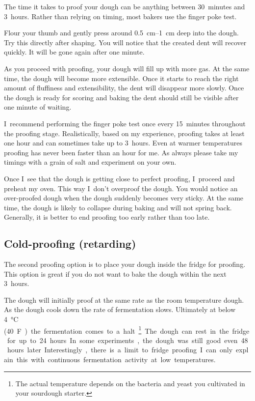 The time it takes to proof your dough can be anything between 30~minutes and
3~hours. Rather than relying on timing, most bakers use the finger poke test.

Flour your thumb and gently press around \qtyrange{0.5}{1}{cm} deep into the
dough.  Try this directly after shaping. You will notice that the created dent
will recover quickly. It will be gone again after one minute.

As you proceed with proofing, your dough will fill up with more gas. At the
same time, the dough will become more extensible. Once it starts to reach the
right amount of fluffiness and extensibility, the dent will disappear more
slowly.  Once the dough is ready for scoring and baking the dent should still
be visible after one minute of waiting.

I~recommend performing the finger poke test once every 15~minutes throughout
the proofing stage. Realistically, based on my experience, proofing takes at least
one hour and can sometimes take up to 3~hours. Even at warmer temperatures proofing
has never been faster than an hour for me. As always please take my timings with
a grain of salt and experiment on your own.

Once I~see that the dough is getting close to perfect proofing, I~proceed and
preheat my oven. This way I~don't overproof the dough. You would notice an
over-proofed dough when the dough suddenly becomes very sticky. At the same
time, the dough is likely to collapse during baking and will not spring back.
Generally, it is better to end proofing too early rather than too late.

\subsection{Cold-proofing (retarding)}

The second proofing option is to place your dough inside the fridge for
proofing. This option is great if you do not want to bake the dough
within the next 3~hours.

The dough will initially proof at the same rate as the room temperature dough.
As the dough cools down the rate of fermentation slows. Ultimately at below
\qty{4}{\degreeCelsius} (\qty{40}F) the fermentation comes to a halt\footnote{The actual temperature
depends on the bacteria and yeast you cultivated in your sourdough
starter.}. The dough can rest in the fridge for up to 24~hours. In some
experiments, the dough was still good even 48~hours later. Interestingly,
there is a limit to fridge proofing. I~can only explain this with continuous
fermentation activity at low temperatures.

